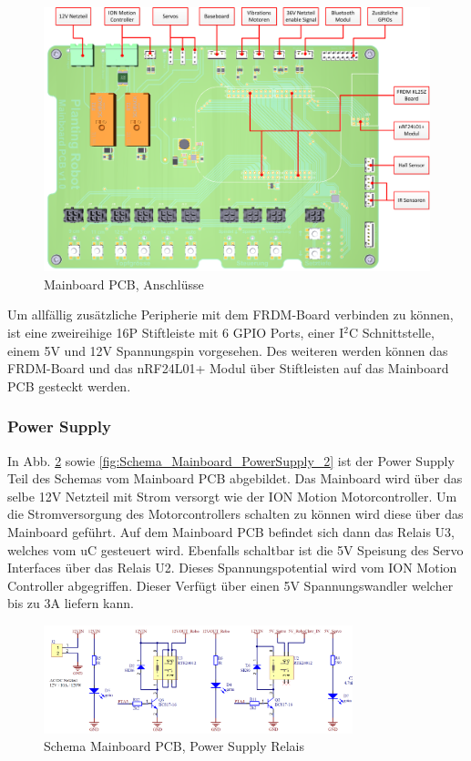 \begin{figure}[H]
	\includegraphics[width=1\textwidth]{Illustrationen/6-Umsetzung/Mainboard_PCB_Anschluesse.png}
	\caption{Mainboard PCB, Anschlüsse}
	\label{fig:Mainboard_3D}
\end{figure}

Um allfällig zusätzliche Peripherie mit dem FRDM-Board verbinden zu können, ist eine zweireihige 16P Stiftleiste mit 6 GPIO Ports, einer I$^{2}$C Schnittstelle, einem 5V und 12V Spannungspin vorgesehen. Des weiteren werden können das FRDM-Board und das nRF24L01+ Modul über Stiftleisten auf das Mainboard PCB gesteckt werden.

\subsubsection{Power Supply}
In Abb. \ref{fig:Schema_Mainboard_PowerSupply_1} sowie \ref{fig:Schema_Mainboard_PowerSupply_2} ist der Power Supply Teil des Schemas vom Mainboard PCB abgebildet. Das Mainboard wird über das selbe 12V Netzteil mit Strom versorgt wie der ION Motion Motorcontroller. Um die Stromversorgung des Motorcontrollers schalten zu können wird diese über das Mainboard geführt. Auf dem Mainboard PCB befindet sich dann das Relais U3, welches vom uC gesteuert wird. Ebenfalls schaltbar ist die 5V Speisung des Servo Interfaces über das Relais U2. Dieses Spannungspotential wird vom ION Motion Controller abgegriffen. Dieser Verfügt über einen 5V Spannungswandler welcher bis zu 3A liefern kann. 

\begin{figure}[H]
	\includegraphics[width=0.8\textwidth]{Illustrationen/6-Umsetzung/Schema_Mainboard_PowerSupply_1.png}
	\caption{Schema Mainboard PCB, Power Supply Relais}
	\label{fig:Schema_Mainboard_PowerSupply_1}
\end{figure}

